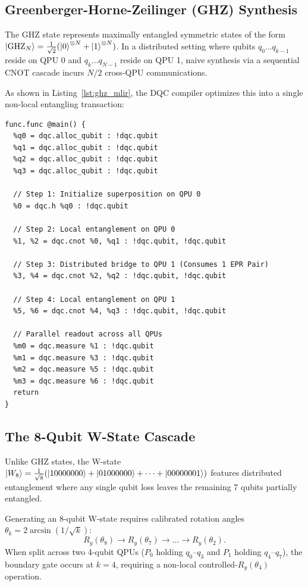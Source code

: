 \subsection{Greenberger-Horne-Zeilinger (GHZ) Synthesis}
The GHZ state represents maximally entangled symmetric states of the form $\ket{\text{GHZ}_N} = \frac{1}{\sqrt{2}}(\ket{0}^{\otimes N} + \ket{1}^{\otimes N})$. In a distributed setting where qubits $q_0 \dots q_{k-1}$ reside on QPU 0 and $q_k \dots q_{N-1}$ reside on QPU 1, naive synthesis via a sequential CNOT cascade incurs $N/2$ cross-QPU communications.

As shown in Listing~\ref{lst:ghz_mlir}, the DQC compiler optimizes this into a single non-local entangling transaction:
\begin{lstlisting}[language=MLIR, caption={Distributed GHZ State Generation in DQC MLIR (ghz\_state.mlir)}, label={lst:ghz_mlir}]
func.func @main() {
  %q0 = dqc.alloc_qubit : !dqc.qubit
  %q1 = dqc.alloc_qubit : !dqc.qubit
  %q2 = dqc.alloc_qubit : !dqc.qubit
  %q3 = dqc.alloc_qubit : !dqc.qubit

  // Step 1: Initialize superposition on QPU 0
  %0 = dqc.h %q0 : !dqc.qubit

  // Step 2: Local entanglement on QPU 0
  %1, %2 = dqc.cnot %0, %q1 : !dqc.qubit, !dqc.qubit

  // Step 3: Distributed bridge to QPU 1 (Consumes 1 EPR Pair)
  %3, %4 = dqc.cnot %2, %q2 : !dqc.qubit, !dqc.qubit

  // Step 4: Local entanglement on QPU 1
  %5, %6 = dqc.cnot %4, %q3 : !dqc.qubit, !dqc.qubit

  // Parallel readout across all QPUs
  %m0 = dqc.measure %1 : !dqc.qubit
  %m1 = dqc.measure %3 : !dqc.qubit
  %m2 = dqc.measure %5 : !dqc.qubit
  %m3 = dqc.measure %6 : !dqc.qubit
  return
}
\end{lstlisting}

\subsection{The 8-Qubit W-State Cascade}
Unlike GHZ states, the W-state $\ket{W_8} = \frac{1}{\sqrt{8}}(\ket{10000000} + \ket{01000000} + \dots + \ket{00000001})$ features distributed entanglement where any single qubit loss leaves the remaining 7 qubits partially entangled.

Generating an 8-qubit W-state requires calibrated rotation angles $\theta_k = 2 \arcsin(1/\sqrt{k})$:
\begin{equation}
    R_y(\theta_8) \to R_y(\theta_7) \to \dots \to R_y(\theta_2).
\end{equation}
When split across two 4-qubit QPUs ($P_0$ holding $q_0\text{--}q_3$ and $P_1$ holding $q_4\text{--}q_7$), the boundary gate occurs at $k=4$, requiring a non-local controlled-$R_y(\theta_4)$ operation.

